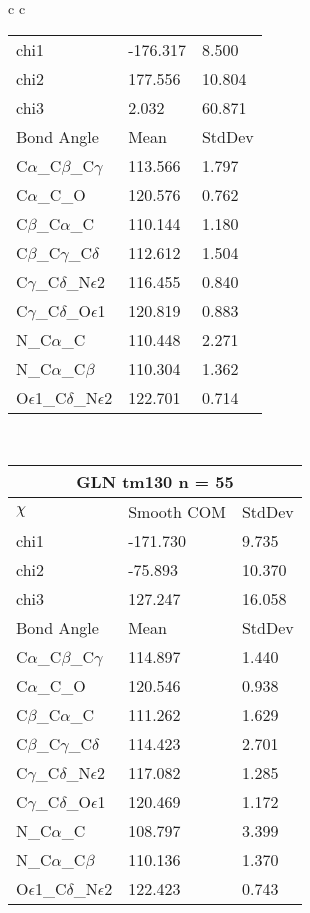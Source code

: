 \begin{longtable}{ c c }
\begin{tabular}{ l l l }
  chi1 & -176.317 & 8.500 \\ 
  chi2 & 177.556 & 10.804 \\ 
  chi3 & 2.032 & 60.871 \\ \midrule
  Bond Angle   & Mean     & StdDev \\ \midrule
  C$\alpha$\_C$\beta$\_C$\gamma$ & 113.566 & 1.797\\
  C$\alpha$\_C\_O & 120.576 & 0.762\\
  C$\beta$\_C$\alpha$\_C & 110.144 & 1.180\\
  C$\beta$\_C$\gamma$\_C$\delta$ & 112.612 & 1.504\\
  C$\gamma$\_C$\delta$\_N$\epsilon$2 & 116.455 & 0.840\\
  C$\gamma$\_C$\delta$\_O$\epsilon$1 & 120.819 & 0.883\\
  N\_C$\alpha$\_C & 110.448 & 2.271\\
  N\_C$\alpha$\_C$\beta$ & 110.304 & 1.362\\
  O$\epsilon$1\_C$\delta$\_N$\epsilon$2 & 122.701 & 0.714\\
  \bottomrule
  \end{tabular}
  \\
  \begin{tabular}{ l l l }
  \toprule
  \multicolumn{3}{c}{GLN \textbf{tm130} n = 55} \\ \toprule
  $\chi$       & Smooth COM & StdDev \\ \midrule
  chi1 & -171.730 & 9.735 \\ 
  chi2 & -75.893 & 10.370 \\ 
  chi3 & 127.247 & 16.058 \\ \midrule
  Bond Angle   & Mean     & StdDev \\ \midrule
  C$\alpha$\_C$\beta$\_C$\gamma$ & 114.897 & 1.440\\
  C$\alpha$\_C\_O & 120.546 & 0.938\\
  C$\beta$\_C$\alpha$\_C & 111.262 & 1.629\\
  C$\beta$\_C$\gamma$\_C$\delta$ & 114.423 & 2.701\\
  C$\gamma$\_C$\delta$\_N$\epsilon$2 & 117.082 & 1.285\\
  C$\gamma$\_C$\delta$\_O$\epsilon$1 & 120.469 & 1.172\\
  N\_C$\alpha$\_C & 108.797 & 3.399\\
  N\_C$\alpha$\_C$\beta$ & 110.136 & 1.370\\
  O$\epsilon$1\_C$\delta$\_N$\epsilon$2 & 122.423 & 0.743\\

\end{tabular}
\end{longtable}
